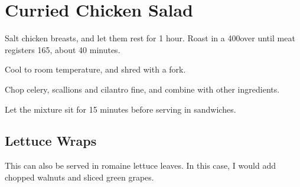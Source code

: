 

\section{Curried Chicken Salad}
\begin{recipe}



Salt chicken breasts, and let them rest for 1 hour. Roast in a 400\degree over until meat registers 165\degree, about 40 minutes.

Cool to room temperature, and shred with a fork.


Chop celery, scallions and cilantro fine, and combine with other ingredients.

Let the mixture sit for 15 minutes before serving in sandwiches.

\subsection{Lettuce Wraps}

This can also be served in romaine lettuce leaves. In this case, I would  add chopped walnuts and sliced green grapes.

\end{recipe}
